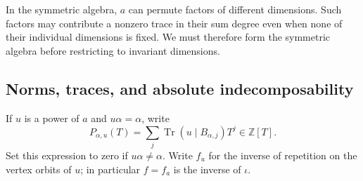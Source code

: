 \documentclass[11pt, reqno]{amsart}
\numberwithin{equation}{section}
\theoremstyle{definition}
\theoremstyle{remark}
\newcommand{\op}[1]{\operatorname{#1}}
\newcommand{\mb}[1]{\mathbb{#1}}
\newcommand{\Tr}{\op{Tr}}
\begin{document}
In the symmetric algebra, $a$ can permute factors of different
dimensions. Such factors may contribute a nonzero trace in their sum
degree even when none of their individual dimensions is fixed. We must
therefore form the symmetric algebra before restricting to invariant
dimensions.

\subsection{Norms, traces, and absolute indecomposability}

If $u$ is a power of $a$ and $u\alpha=\alpha$, write
\[ P_{\alpha,u}(T)=\sum_j\Tr(u\mid B_{\alpha,j})T^j\in\mb Z[T]. \]
Set this expression to zero if $u\alpha\ne\alpha$. Write $f_u$
for the inverse of repetition on the vertex orbits of $u$; in
particular $f=f_a$ is the inverse of $\iota$.
\end{document}

